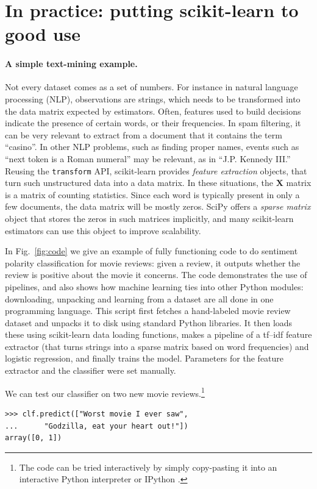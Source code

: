 \documentclass[a4paper]{article}
\begin{document}
\section{In practice: putting scikit-learn to good use}

\paragraph{A simple text-mining example.}
%
Not every dataset comes as a set of numbers. For instance in natural
language processing (NLP), observations are strings,
which needs to be transformed into the data matrix expected by
estimators. Often, features used to build decisions indicate the
presence of certain words, or their frequencies.
In spam filtering, it can be very relevant to extract from a document that
it contains the term ``casino''.
In other NLP problems, such as finding proper names,
events such as ``next token is a Roman numeral'' may be relevant, as in
``J.P. Kennedy III.''
Reusing the {\tt transform} API, scikit-learn
provides \emph{feature extraction} objects, that turn such
unstructured data into a data matrix. In these situations, the
$\textbf{X}$ matrix is a matrix of counting statistics.
Since each word is typically present in only a few documents,
the data matrix will be mostly zeros.
SciPy offers a \emph{sparse matrix} object
that stores the zeros in such matrices implicitly,
and many scikit-learn estimators can use this object to improve scalability.

In Fig.~\ref{fig:code} we give an example of fully functioning code to
do sentiment polarity classification for movie reviews: given a review,
it outputs whether the review is positive about the movie it concerns.
The code demonstrates the use of pipelines, and also shows how machine
learning ties into other Python modules: downloading, unpacking and
learning from a dataset are all done in one programming language.
This script first fetches a hand-labeled movie review dataset
\cite{pang2004} and unpacks it to disk using standard Python libraries.
It then loads these using scikit-learn data loading functions, makes a
pipeline of a \textsf{tf--idf} feature extractor
\cite{rennie2003tackling} (that turns strings into a sparse matrix based
on word frequencies) and logistic regression, and finally trains the
model. Parameters for the feature extractor and the classifier
were set manually.

We can test our classifier on two new movie reviews.\footnote{
  The code can be tried interactively by simply copy-pasting it
  into an interactive Python interpreter or IPython \cite{perez2007ipython}.
}
\begin{lstlisting}
>>> clf.predict(["Worst movie I ever saw",
...      "Godzilla, eat your heart out!"])
array([0, 1])
\end{lstlisting}
\end{document}
